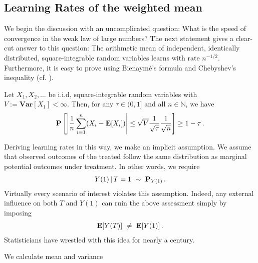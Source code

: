 

\subsection{Learning Rates of the weighted mean}

We begin the discussion with an
uncomplicated question:
What is the speed of convergence in the weak law of large numbers?
The next statement gives a clear-cut answer to this question:
The arithmetic mean of independent, identically distributed, square-integrable random variables 
learns with rate $n^{-1/2}$.
Furthermore, it is easy to prove using
Bienaymé's formula and Chebyshev's inequality (cf. \cite[Theorem~5.14]{Klenke2020}).


\begin{theorem*}
  Let 
  $
    X_1,X_2,\ldots
  $
  be i.i.d, square-integrable random variables with 
  $
    V:=
    \mathbf{Var}[X_1]
    <\infty
  $.
  Then, for any $\tau \in (0,1]$ and all $n\in\mathbb{N}$, we have
  \begin{gather}
   \mathbf{P}
   \left[
     \left| 
   \frac{1}{n}
   \sum_{i=1}^{n}
   (X_i - \mathbf{E}[X_i])
     \right|
     \le
     \sqrt{V}
     \frac{1}{\sqrt{\tau}}
     \frac{1}{\sqrt{n}}
   \right]
   \ge
   1-\tau\,.
  \end{gather}
\end{theorem*}

Deriving learning rates in this way, we make an implicit assumption.
We assume that
observed outcomes of the treated follow the same distribution as
marginal potential outcomes under treatment.
In other words, we require
\begin{gather}
  Y(1)\,|\,T=1
  \ 
  \sim 
  \ 
  \P_
  {
  Y(1)
  }
  \,.
\end{gather}
Virtually every scenario of interest violates this assumption.
Indeed, any external influence on both $T$ and $Y(1)$ can ruin the 
above assessment simply by imposing 
\begin{gather}
  \mathbf{E}[Y(T)]\ \neq\  \mathbf{E}[Y(1)]
  \,.
\end{gather}
Statisticians have wrestled with this idea for nearly a century.

We calculate mean and variance

